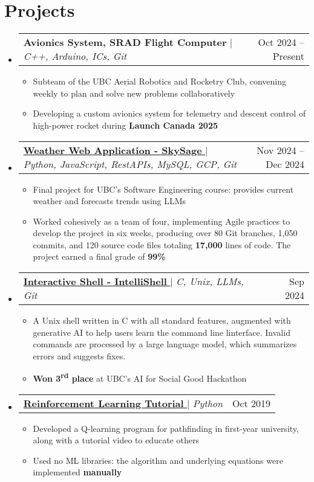\documentclass[letterpaper,10pt]{article}
\makeatletter
\newcommand{\resumeProjectItem}[1]{
  \item\footnotesize{
    {#1 \vspace{-1.5pt}}
  }
}
\newcommand{\resumeProjectHeading}[2]{
    \item
    \begin{tabular*}{0.97\textwidth}{l@{\extracolsep{\fill}}r}
      \small#1 & #2 \\
    \end{tabular*}\vspace{-7pt}
}
\newcommand{\resumeSubHeadingListStart}{\begin{itemize}[leftmargin=0.15in, label={}]}
\newcommand{\resumeSubHeadingListEnd}{\end{itemize}}
\newcommand{\resumeItemListStart}{\begin{itemize}}
\newcommand{\resumeItemListEnd}{\end{itemize}\vspace{-5pt}}
\def\iconSpace{0.5pt}
\def\projectSpaceBefore{1pt}
\makeatother
\begin{document}
\section{Projects}
    \resumeSubHeadingListStart
      \resumeProjectHeading
          {\textbf{Avionics System, SRAD Flight Computer} $|$ \textit{C++, Arduino, ICs, Git}}{Oct 2024 -- Present}
          \resumeItemListStart
            \vspace{\projectSpaceBefore}
            \resumeProjectItem{Subteam of the UBC Aerial Robotics and Rocketry Club, convening weekly to plan and solve new problems collaboratively}
            \resumeProjectItem{Developing a custom avionics system for telemetry and descent control of high-power rocket during \textbf{Launch Canada 2025}}
          \resumeItemListEnd
      \resumeProjectHeading
          {\href{https://github.com/rileyeaton-ubc/SkySage}{\textbf{Weather Web Application - SkySage} \faGithub} \hspace{\iconSpace}$|$ \textit{Python, JavaScript, RestAPIs, MySQL, GCP, Git}}{Nov 2024 -- Dec 2024}
          \resumeItemListStart
            \vspace{\projectSpaceBefore}
            \resumeProjectItem{Final project for UBC's Software Engineering course: provides current weather and forecasts trends using LLMs}
            \resumeProjectItem{Worked cohesively as a team of four, implementing Agile practices to develop the project in six weeks, producing over 80 Git branches, 1,050 commits, and 120 source code files totaling \textbf{17,000} lines of code. The project earned a final grade of \textbf{99\%}}
          \resumeItemListEnd
      \resumeProjectHeading
          {\href{https://github.com/rileyeaton-ubc/intellishell-ai-hackathon}{\textbf{Interactive Shell - IntelliShell} \faGithub} \hspace{\iconSpace}$|$ \textit{C, Unix, LLMs, Git}}{Sep 2024}
          \resumeItemListStart
            \vspace{\projectSpaceBefore}
            \resumeProjectItem{A Unix shell written in C with all standard features, augmented with generative AI to help users learn the command line linterface. Invalid commands are processed by a large language model, which summarizes errors and suggests fixes.}
            \resumeProjectItem{\textbf{Won 3\textsuperscript{rd} place} at UBC's AI for Social Good Hackathon}
          \resumeItemListEnd
      \resumeProjectHeading
          {\href{https://youtu.be/e59wArs9kp4}{\textbf{Reinforcement Learning Tutorial} \faYoutubePlay} \hspace{\iconSpace}$|$ \textit{Python}}{Oct 2019}
          \resumeItemListStart
            \vspace{\projectSpaceBefore}
            \resumeProjectItem{Developed a Q-learning program for pathfinding in first-year university, along with a tutorial video to educate others}
            \resumeProjectItem{Used no ML libraries: the algorithm and underlying equations were implemented \textbf{manually}}
          \resumeItemListEnd
    \resumeSubHeadingListEnd
\end{document}
